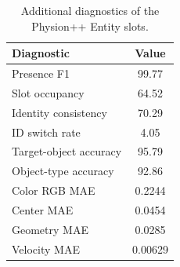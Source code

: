 \begin{table}[t]
\centering
\caption{Additional diagnostics of the Physion++ Entity slots.}
\label{tab:physion-slot-diagnostics}
\scriptsize
\renewcommand{\arraystretch}{1.03}
\begin{tabularx}{0.70\linewidth}{@{}Lc@{}}
\toprule\toprule
\textbf{Diagnostic} & \textbf{Value} \\
\midrule
Presence F1 & 99.77 \\
Slot occupancy & 64.52 \\
Identity consistency & 70.29 \\
ID switch rate & 4.05 \\
Target-object accuracy & 95.79 \\
Object-type accuracy & 92.86 \\
Color RGB MAE & 0.2244 \\
Center MAE & 0.0454 \\
Geometry MAE & 0.0285 \\
Velocity MAE & 0.00629 \\
\bottomrule
\end{tabularx}
\end{table}
